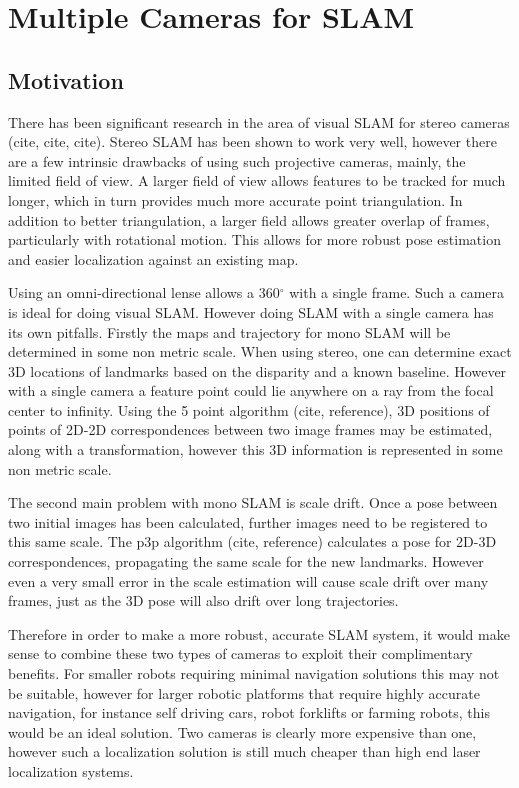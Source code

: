 \chapter{Multiple Cameras for SLAM}
\label{chapter:MultiCamSLAM}

\section{Motivation}

There has been significant research in the area of visual SLAM for stereo cameras (cite, cite, cite).  Stereo SLAM has been shown to work very well, however there are a few intrinsic drawbacks of using such projective cameras, mainly, the limited field of view.  A larger field of view allows features to be tracked for much longer, which in turn provides much more accurate point triangulation.  In addition to better triangulation, a larger field allows greater overlap of frames, particularly with rotational motion.  This allows for more robust pose estimation and easier localization against an existing map. %

Using an omni-directional lense allows a 360$^{\circ}$ with a single frame.  Such a camera is ideal for doing visual SLAM.  However doing SLAM with a single camera has its own pitfalls.  Firstly the maps and trajectory for mono SLAM will be determined in some non metric scale.  When using stereo, one can determine exact 3D locations of landmarks based on the disparity and a known baseline.  However with a single camera a feature point could lie anywhere on a ray from the focal center to infinity.  Using the 5 point algorithm (cite, reference), 3D positions of points of 2D-2D correspondences between two image frames may be estimated, along with a transformation, however this 3D information is represented in some non metric scale.

The second main problem with mono SLAM is scale drift.  Once a pose between two initial images has been calculated, further images need to be registered to this same scale.  The p3p algorithm (cite, reference) calculates a pose for 2D-3D correspondences, propagating the same scale for the new landmarks.  However even a very small error in the scale estimation will cause scale drift over many frames, just as the 3D pose will also drift over long trajectories.

Therefore in order to make a more robust, accurate SLAM system, it would make sense to combine these two types of cameras to exploit their complimentary benefits.  For smaller robots requiring minimal navigation solutions this may not be suitable, however for larger robotic platforms that require highly accurate navigation, for instance self driving cars, robot forklifts or farming robots, this would be an ideal solution.  Two cameras is clearly more expensive than one, however such a localization solution is still much cheaper than high end laser localization systems.

